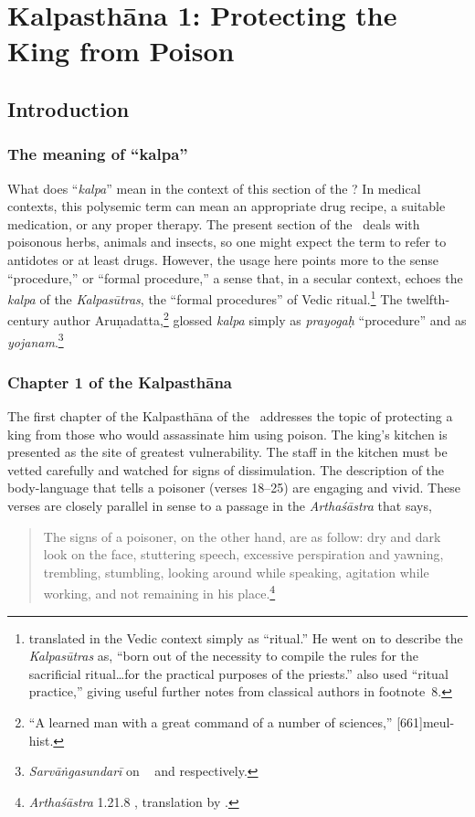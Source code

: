 \chapter{Kalpasthāna 1: Protecting the King from Poison}

\section{Introduction}

\subsection{The meaning of “kalpa”}

What does “\emph{kalpa}” mean in the context of this section of the
\SS? In medical contexts, this polysemic term can mean an appropriate
drug recipe, a suitable medication, or any proper therapy.  The
present section of the \SS\ deals with poisonous herbs, animals and
insects, so one might expect the term to refer to antidotes or at
least drugs. However, the usage here points more to the sense
“procedure,” or “formal procedure,”  a sense that, in a secular context, 
echoes the
\emph{kalpa} of the \emph{Kalpasūtras}, the “formal procedures” of
Vedic ritual.\footnote{\citet[252]{wint-1981} translated 
    in the Vedic context simply as “ritual.”  He went on to describe the
    \emph{Kalpasūtras} as, “born out of the necessity to compile the
rules for
    the sacrificial ritual\ldots for the practical purposes of the
    priests.” \citet[467]{gond-1977} also used “ritual practice,” giving
    useful  further notes from classical authors in footnote~8.}
The twelfth-century author Aruṇadatta,\footnote{“A learned man with a great
command of a number of sciences,” [661]{meul-hist}.}
glossed \emph{kalpa} simply as \emph{prayogaḥ} “procedure”  and as
\emph{yojanam}.\footnote{\emph{Sarvāṅgasundarī} on \AH\
     and  
    respectively.}


\subsection{Chapter 1 of the Kalpasthāna}
The first chapter of the Kalpasthāna of the \SS\
addresses the topic of protecting a king from those who would
assassinate him using poison. The king's kitchen is presented as the
site of greatest vulnerability.  The staff in the kitchen must be
vetted carefully and watched for signs of dissimulation.  The
description of the body-language that tells a poisoner (verses 18--25)
are engaging and vivid.  These verses are closely parallel in sense to
a passage in the \emph{Arthaśāstra} that says,
\begin{quote}
    The signs of a poisoner, on the other hand, are as follow: dry and
dark look on the face, stuttering speech, excessive perspiration
and yawning, trembling, stumbling, looking around while speaking,
agitation while working, and not remaining in his
place.\footnote{\emph{Arthaśāstra} 1.21.8 \citep[1,
    30]{kang-1969}, translation by \citet[97]{oliv-2013}.}
\end{quote}

